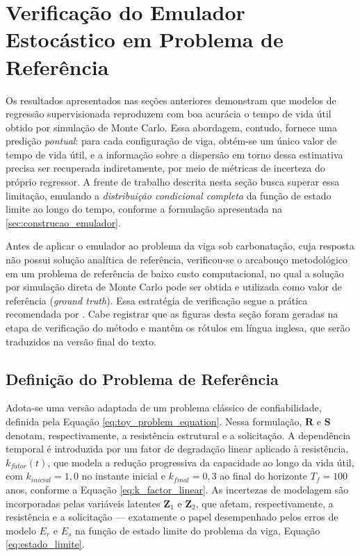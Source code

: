 \section{Verificação do Emulador Estocástico em Problema de Referência} \label{sec:res_emulador}

Os resultados apresentados nas seções anteriores demonstram que modelos de regressão supervisionada reproduzem com boa acurácia o tempo de vida útil obtido por simulação de Monte Carlo. Essa abordagem, contudo, fornece uma predição \textit{pontual}: para cada configuração de viga, obtém-se um único valor de tempo de vida útil, e a informação sobre a dispersão em torno dessa estimativa precisa ser recuperada indiretamente, por meio de métricas de incerteza do próprio regressor. A frente de trabalho descrita nesta seção busca superar essa limitação, emulando a \textit{distribuição condicional completa} da função de estado limite ao longo do tempo, conforme a formulação apresentada na \autoref{sec:construcao_emulador}.

Antes de aplicar o emulador ao problema da viga sob carbonatação, cuja resposta não possui solução analítica de referência, verificou-se o arcabouço metodológico em um problema de referência de baixo custo computacional, no qual a solução por simulação direta de Monte Carlo pode ser obtida e utilizada como valor de referência (\textit{ground truth}). Essa estratégia de verificação segue a prática recomendada por \textcite{pires2024}. Cabe registrar que as figuras desta seção foram geradas na etapa de verificação do método e mantêm os rótulos em língua inglesa, que serão traduzidos na versão final do texto.

\subsection{Definição do Problema de Referência}

Adota-se uma versão adaptada de um problema clássico de confiabilidade, definida pela Equação \eqref{eq:toy_problem_equation}. Nessa formulação, $\mathbf{R}$ e $\mathbf{S}$ denotam, respectivamente, a resistência estrutural e a solicitação. A dependência temporal é introduzida por um fator de degradação linear aplicado à resistência, $k_{fator}(t)$, que modela a redução progressiva da capacidade ao longo da vida útil, com $k_{inicial} = 1{,}0$ no instante inicial e $k_{final} = 0{,}3$ ao final do horizonte $T_f = 100$ anos, conforme a Equação \eqref{eq:k_factor_linear}. As incertezas de modelagem são incorporadas pelas variáveis latentes $\mathbf{Z}_1$ e $\mathbf{Z}_2$, que afetam, respectivamente, a resistência e a solicitação --- exatamente o papel desempenhado pelos erros de modelo $E_r$ e $E_s$ na função de estado limite do problema da viga, Equação \eqref{eq:estado_limite}.

